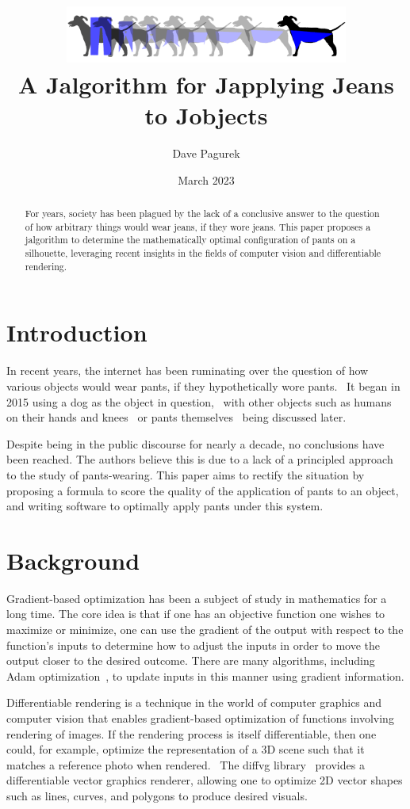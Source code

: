 \documentclass[twocolumn]{article}
\title{\includegraphics[width=0.7\textwidth]{img/teaser.png}\\A Jalgorithm for Japplying Jeans to Jobjects}
\author{Dave Pagurek}
\date{March 2023}
\begin{document}
\maketitle

\begin{abstract}
    For years, society has been plagued by the lack of a conclusive answer to the question of how arbitrary things would wear jeans, if they wore jeans. This paper proposes a jalgorithm to determine the mathematically optimal configuration of pants on a silhouette, leveraging recent insights in the fields of computer vision and differentiable rendering.
\end{abstract}

\section{Introduction}

In recent years, the internet has been ruminating over the question of how various objects would wear pants, if they hypothetically wore pants.~\cite{know_your_meme} It began in 2015 using a dog as the object in question,~\cite{utopian_raspberry} with other objects such as  humans on their hands and knees~\cite{reddit} or pants themselves~\cite{twitter} being discussed later. 

Despite being in the public discourse for nearly a decade, no conclusions have been reached. The authors believe this is due to a lack of a principled approach to the study of pants-wearing. This paper aims to rectify the situation by proposing a formula to score the quality of the application of pants to an object, and writing software to optimally apply pants under this system.

\section{Background}

Gradient-based optimization has been a subject of study in mathematics for a long time. The core idea is that if one has an objective function one wishes to maximize or minimize, one can use the gradient of the output with respect to the function's inputs to determine how to adjust the inputs in order to move the output closer to the desired outcome. There are many algorithms, including Adam optimization~\cite{Adam}, to update inputs in this manner using gradient information.

Differentiable rendering is a technique in the world of computer graphics and computer vision that enables gradient-based optimization of functions involving rendering of images. If the rendering process is itself differentiable, then one could, for example, optimize the representation of a 3D scene such that it matches a reference photo when rendered.~\cite{liu2019softras,liu2020general} The diffvg library~\cite{Li:2020:DVG} provides a differentiable vector graphics renderer, allowing one to optimize 2D vector shapes such as lines, curves, and polygons to produce desired visuals.
\end{document}

